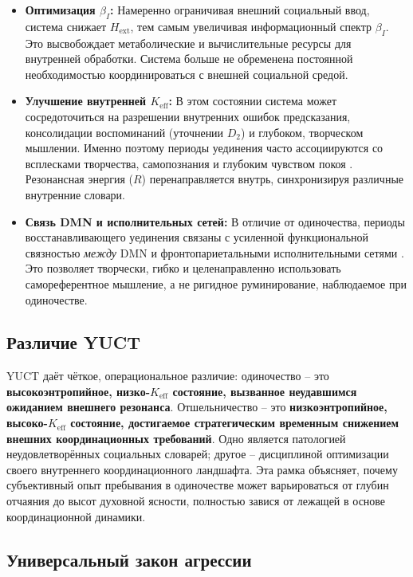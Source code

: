 \documentclass[12pt,a4paper]{article}
\begin{document}
	\begin{itemize}
		\item \textbf{Оптимизация \(\beta_I\):} Намеренно ограничивая внешний социальный ввод, система снижает \(H_{\mathrm{ext}}\), тем самым увеличивая информационный спектр \(\beta_I\). Это высвобождает метаболические и вычислительные ресурсы для внутренней обработки. Система больше не обременена постоянной необходимостью координироваться с внешней социальной средой.
		\item \textbf{Улучшение внутренней \(K_{\mathrm{eff}}\):} В этом состоянии система может сосредоточиться на разрешении внутренних ошибок предсказания, консолидации воспоминаний (уточнении \(D_2\)) и глубоком, творческом мышлении. Именно поэтому периоды уединения часто ассоциируются со всплесками творчества, самопознания и глубоким чувством покоя \cite{Nguyen2023}. Резонансная энергия (\(R\)) перенаправляется внутрь, синхронизируя различные внутренние словари.
		\item \textbf{Связь DMN и исполнительных сетей:} В отличие от одиночества, периоды восстанавливающего уединения связаны с усиленной функциональной связностью \textit{между} DMN и фронтопариетальными исполнительными сетями \cite{Llera2024}. Это позволяет творчески, гибко и целенаправленно использовать самореферентное мышление, а не ригидное руминирование, наблюдаемое при одиночестве.
	\end{itemize}
	
	\subsection{Различие YUCT}
	
	YUCT даёт чёткое, операциональное различие: одиночество – это \textbf{высокоэнтропийное, низко-\(K_{\mathrm{eff}}\) состояние, вызванное неудавшимся ожиданием внешнего резонанса}. Отшельничество – это \textbf{низкоэнтропийное, высоко-\(K_{\mathrm{eff}}\) состояние, достигаемое стратегическим временным снижением внешних координационных требований}. Одно является патологией неудовлетворённых социальных словарей; другое – дисциплиной оптимизации своего внутреннего координационного ландшафта. Эта рамка объясняет, почему субъективный опыт пребывания в одиночестве может варьироваться от глубин отчаяния до высот духовной ясности, полностью завися от лежащей в основе координационной динамики.
	
	\subsection{Универсальный закон агрессии}
	
\end{document}
